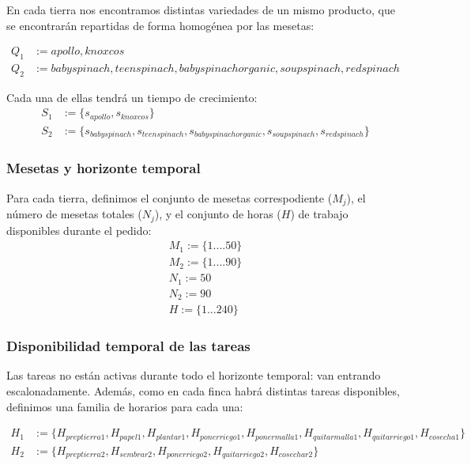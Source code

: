 En cada tierra nos encontramos distintas variedades de un mismo producto, que se encontrarán repartidas de forma homogénea por las mesetas:

\[\begin{aligned}
        Q_1&:={apollo, knoxcos}\\
        Q_2&:={babyspinach, teenspinach, babyspinachorganic, soupspinach, redspinach}
    \end{aligned}\]

Cada una de ellas tendrá un tiempo de crecimiento:
\[\begin{aligned}
        S_1&:=\{s_{apollo},s_{knoxcos}\}\\
        S_2&:=\{s_{babyspinach}, s_{teenspinach}, s_{babyspinachorganic}, s_{soupspinach}, s_{redspinach}\}
    \end{aligned}\]



\subsubsection{Mesetas y horizonte temporal}

Para cada tierra, definimos el conjunto de mesetas correspodiente ($M_j$), el número de mesetas totales ($N_j$), y el conjunto de horas ($H$) de trabajo disponibles durante el pedido:
    \[\begin{aligned}
        M_1:=\{1....50\}\\
        M_2:=\{1....90\}\\
        N_1:=50\\
        N_2:=90\\
        H:=\{1...240\}
    \end{aligned}\]

\subsubsection{Disponibilidad temporal de las tareas}

Las tareas no están activas durante todo el horizonte temporal: van entrando escalonadamente. 
Además, como en cada finca habrá distintas tareas disponibles, definimos una familia de horarios para cada una:

\[\begin{aligned}
    H_1 &:= \{H_{preptierra1},H_{papel1},H_{plantar1},H_{ponerriego1},H_{ponermalla1},H_{quitarmalla1},H_{quitarriego1},H_{cosecha1}\}\\
    H_2 &:= \{H_{preptierra2},H_{sembrar2},H_{ponerriego2},H_{quitarriego2},H_{cosechar2}\}   
\end{aligned}\]    

